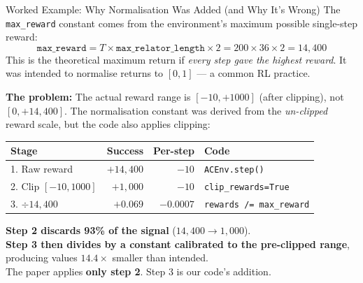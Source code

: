 \documentclass[aspectratio=169,11pt]{beamer}
\begin{document}
\begin{frame}{Worked Example: Why Normalisation Was Added (and Why It's Wrong)}
  \small
  The \texttt{max\_reward} constant comes from the environment's maximum possible
  single-step reward:
  \[
    \texttt{max\_reward} = T \times \texttt{max\_relator\_length} \times 2
    = 200 \times 36 \times 2 = 14{,}400
  \]
  This is the theoretical maximum return if \emph{every step gave the highest reward}.
  It was intended to normalise returns to $[0, 1]$ --- a common RL practice.

  \medskip
  \textbf{The problem:} The actual reward range is $[-10, +1000]$ (after clipping),
  not $[0, +14{,}400]$.  The normalisation constant was derived from the
  \emph{un-clipped} reward scale, but the code also applies clipping:

  \medskip
  \begin{center}
  \footnotesize
  \begin{tabular}{lrrl}
    \toprule
    \textbf{Stage} & \textbf{Success} & \textbf{Per-step} & \textbf{Code} \\
    \midrule
    1. Raw reward & $+14{,}400$ & $-10$ & \texttt{ACEnv.step()} \\
    2. Clip $[-10, 1000]$ & $+1{,}000$ & $-10$ & \texttt{clip\_rewards=True} \\
    3. $\div 14{,}400$ & $+0.069$ & $-0.0007$ & \texttt{rewards /= max\_reward} \\
    \bottomrule
  \end{tabular}
  \end{center}

  \medskip
  \textbf{Step 2 discards 93\% of the signal} ($14{,}400 \to 1{,}000$).\\
  \textbf{Step 3 then divides by a constant calibrated to the pre-clipped range},
  producing values $14.4\times$ smaller than intended.\\[3pt]
  The paper applies \textbf{only step 2}. Step 3 is our code's addition.
\end{frame}
\end{document}
